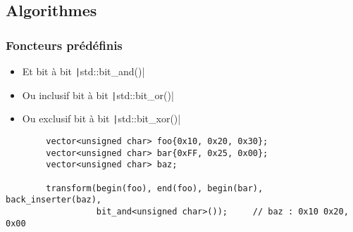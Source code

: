 \documentclass[C++.tex]{subfiles}
\begin{document}
\subsection*{Algorithmes}
\begin{frame}[fragile]
	\frametitle{Foncteurs prédéfinis}
	\begin{itemize}
		\item Et bit à bit \texttt|std::bit_and()|
		\item Ou inclusif bit à bit \texttt|std::bit_or()|
		\item Ou exclusif bit à bit \texttt|std::bit_xor()|
	\end{itemize}

	\begin{verbatim}
		vector<unsigned char> foo{0x10, 0x20, 0x30};
		vector<unsigned char> bar{0xFF, 0x25, 0x00};
		vector<unsigned char> baz;

		transform(begin(foo), end(foo), begin(bar), back_inserter(baz), 
		          bit_and<unsigned char>());     // baz : 0x10 0x20, 0x00
	\end{verbatim}

\end{frame}
\end{document}
